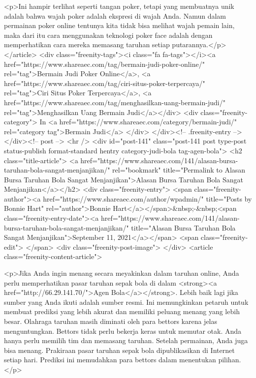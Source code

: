 {<p>Ini hampir terlihat seperti tangan poker, tetapi yang membuatnya unik adalah bahwa wajah poker adalah ekspresi di wajah Anda. Namun dalam permainan poker online tentunya kita tidak bisa melihat wajah pemain lain, maka dari itu cara menggunakan teknologi poker face adalah dengan memperhatikan cara mereka memasang taruhan setiap putarannya.</p>
									</article>
																			<div class="freenity-tags"><i class="fa fa-tags"></i><a href="https://www.shareaec.com/tag/bermain-judi-poker-online/" rel="tag">Bermain Judi Poker Online</a>, <a href="https://www.shareaec.com/tag/ciri-situs-poker-terpercaya/" rel="tag">Ciri Situs Poker Terpercaya</a>, <a href="https://www.shareaec.com/tag/menghasilkan-uang-bermain-judi/" rel="tag">Menghasilkan Uang Bermain Judi</a></div>
																			<div class="freenity-category">
											In <a href="https://www.shareaec.com/category/bermain-judi/" rel="category tag">Bermain Judi</a>										</div>
																	</div><!-- .freenity-entry -->
							</div><!-- post -->
							<hr />
													<div id="post-141" class="post-141 post type-post status-publish format-standard hentry category-judi-bola tag-agen-bola">
								<h2 class="title-article">
									<a href="https://www.shareaec.com/141/alasan-bursa-taruhan-bola-sangat-menjanjikan/" rel="bookmark" title="Permalink to Alasan Bursa Taruhan Bola Sangat Menjanjikan">Alasan Bursa Taruhan Bola Sangat Menjanjikan</a></h2>
								<div class="freenity-entry">
									<span class="freenity-author"><a href="https://www.shareaec.com/author/wpadmin/" title="Posts by Bonnie Hart" rel="author">Bonnie Hart</a></span>&nbsp;-&nbsp;<span class="freenity-entry-date"><a href="https://www.shareaec.com/141/alasan-bursa-taruhan-bola-sangat-menjanjikan/" title="Alasan Bursa Taruhan Bola Sangat Menjanjikan">September 11, 2021</a></span>
									<span class="freenity-edit"> </span>
									<div class="freenity-post-image">  </div>
																		<article class="freenity-content-article">
										
<p>Jika Anda ingin menang secara meyakinkan dalam taruhan online, Anda perlu memperhatikan pasar taruhan sepak bola di dalam <strong><a href="http://66.29.141.70/">Agen Bola</a></strong>. Lebih baik lagi jika sumber yang Anda ikuti adalah sumber resmi. Ini memungkinkan petaruh untuk membuat prediksi yang lebih akurat dan memiliki peluang menang yang lebih besar. Olahraga taruhan masih diminati oleh para bettors karena jelas menguntungkan. Bettors tidak perlu bekerja keras untuk memutar otak. Anda hanya perlu memilih tim dan memasang taruhan. Setelah permainan, Anda juga bisa menang. Prakiraan pasar taruhan sepak bola dipublikasikan di Internet setiap hari. Prediksi ini memudahkan para bettors dalam menentukan pilihan.</p>



}
